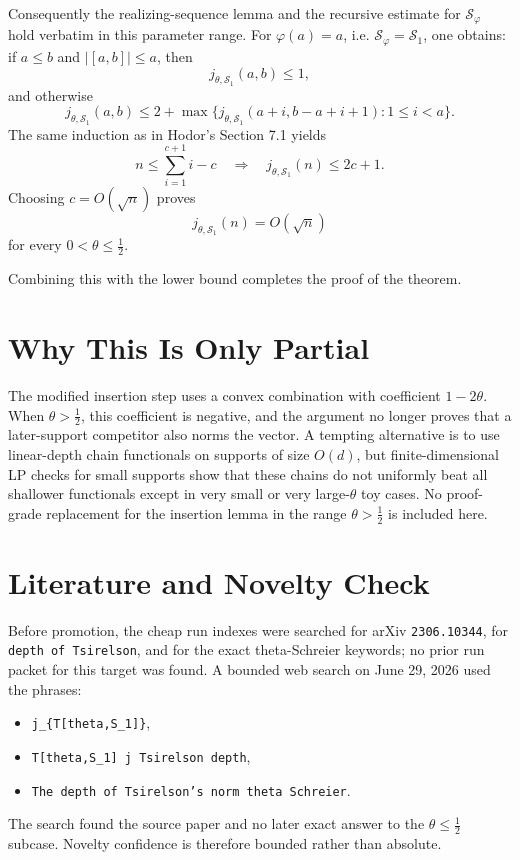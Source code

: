 \documentclass[11pt]{article}
\newcommand{\cS}{\mathcal S}
\begin{document}
Consequently the realizing-sequence lemma and the recursive estimate for
\(\cS_\varphi\) hold verbatim in this parameter range.  For
\(\varphi(a)=a\), i.e. \(\cS_\varphi=\cS_1\), one obtains:
if \(a\leq b\) and \(|[a,b]|\leq a\), then
\[
  j_{\theta,\cS_1}(a,b)\leq 1,
\]
and otherwise
\[
  j_{\theta,\cS_1}(a,b)\leq
  2+\max\{j_{\theta,\cS_1}(a+i,b-a+i+1):1\leq i<a\}.
\]
The same induction as in Hodor's Section 7.1 yields
\[
  n\leq \sum_{i=1}^{c+1}i-c
  \quad\Longrightarrow\quad
  j_{\theta,\cS_1}(n)\leq 2c+1.
\]
Choosing \(c=O(\sqrt n)\) proves
\[
  j_{\theta,\cS_1}(n)=O(\sqrt n)
\]
for every \(0<\theta\leq\frac12\).

Combining this with the lower bound completes the proof of the theorem.

\section*{Why This Is Only Partial}

The modified insertion step uses a convex combination with coefficient
\(1-2\theta\).  When \(\theta>\frac12\), this coefficient is negative, and the
argument no longer proves that a later-support competitor also norms the
vector.  A tempting alternative is to use linear-depth chain functionals on
supports of size \(O(d)\), but finite-dimensional LP checks for small supports
show that these chains do not uniformly beat all shallower functionals except
in very small or very large-\(\theta\) toy cases.  No proof-grade replacement
for the insertion lemma in the range \(\theta>\frac12\) is included here.

\section*{Literature and Novelty Check}

Before promotion, the cheap run indexes were searched for arXiv \texttt{2306.10344},
for \texttt{depth of Tsirelson}, and for the exact theta-Schreier keywords; no prior
run packet for this target was found.  A bounded web search on June 29, 2026
used the phrases:
\begin{itemize}
\item \texttt{j\_\{T[theta,S\_1]\}},
\item \texttt{T[theta,S\_1] j Tsirelson depth},
\item \texttt{The depth of Tsirelson's norm theta Schreier}.
\end{itemize}
The search found the source paper and no later exact answer to the
\(\theta\leq\frac12\) subcase.  Novelty confidence is therefore bounded rather
than absolute.
\end{document}
